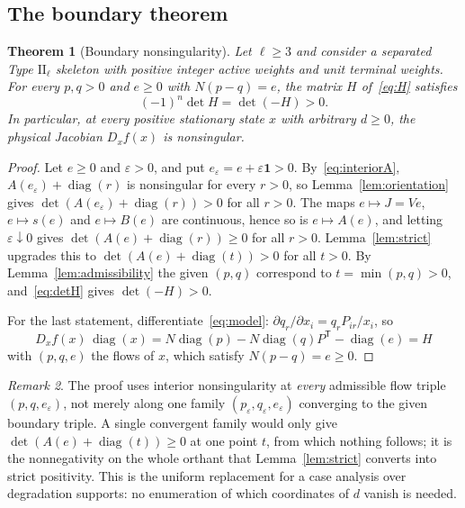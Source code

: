 \documentclass[11pt,a4paper]{article}
\theoremstyle{plain}
\newtheorem{theorem}{Theorem}[section]
\theoremstyle{definition}
\theoremstyle{remark}
\newtheorem{remark}[theorem]{Remark}
\numberwithin{equation}{section}
\newcommand{\one}{\mathbf{1}}
\newcommand{\diag}{\operatorname{diag}}
\newcommand{\II}{\mathrm{II}}
\begin{document}
\subsection{The boundary theorem}

\begin{theorem}[Boundary nonsingularity]\label{thm:boundary}
Let $\ell\ge3$ and consider a separated Type $\II_\ell$ skeleton with positive integer active weights and unit terminal weights. For every $p,q>0$ and $e\ge0$ with $N(p-q)=e$, the matrix $H$ of~\eqref{eq:H} satisfies
\[
(-1)^n\det H=\det(-H)>0 .
\]
In particular, at every positive stationary state $x$ with arbitrary $d\ge0$, the physical Jacobian $D_xf(x)$ is nonsingular.
\end{theorem}

\begin{proof}
Let $e\ge0$ and $\varepsilon>0$, and put $e_\varepsilon=e+\varepsilon\one>0$. By~\eqref{eq:interiorA}, $A(e_\varepsilon)+\diag(r)$ is nonsingular for every $r>0$, so Lemma~\ref{lem:orientation} gives $\det(A(e_\varepsilon)+\diag(r))>0$ for all $r>0$. The maps $e\mapsto J=Ve$, $e\mapsto s(e)$ and $e\mapsto B(e)$ are continuous, hence so is $e\mapsto A(e)$, and letting $\varepsilon\downarrow0$ gives $\det(A(e)+\diag(r))\ge0$ for all $r>0$. Lemma~\ref{lem:strict} upgrades this to $\det(A(e)+\diag(t))>0$ for all $t>0$. By Lemma~\ref{lem:admissibility} the given $(p,q)$ correspond to $t=\min(p,q)>0$, and~\eqref{eq:detH} gives $\det(-H)>0$.

For the last statement, differentiate~\eqref{eq:model}: $\partial q_r/\partial x_i=q_rP_{ir}/x_i$, so
\begin{equation}\label{eq:physical}
D_xf(x)\,\diag(x)=N\diag(p)-N\diag(q)P^{\mathsf T}-\diag(e)=H
\end{equation}
with $(p,q,e)$ the flows of $x$, which satisfy $N(p-q)=e\ge0$.
\end{proof}

\begin{remark}
The proof uses interior nonsingularity at \emph{every} admissible flow triple $(p,q,e_\varepsilon)$, not merely along one family $(p_\varepsilon,q_\varepsilon,e_\varepsilon)$ converging to the given boundary triple. A single convergent family would only give $\det(A(e)+\diag(t))\ge0$ at one point $t$, from which nothing follows; it is the nonnegativity on the whole orthant that Lemma~\ref{lem:strict} converts into strict positivity. This is the uniform replacement for a case analysis over degradation supports: no enumeration of which coordinates of $d$ vanish is needed.
\end{remark}
\end{document}
